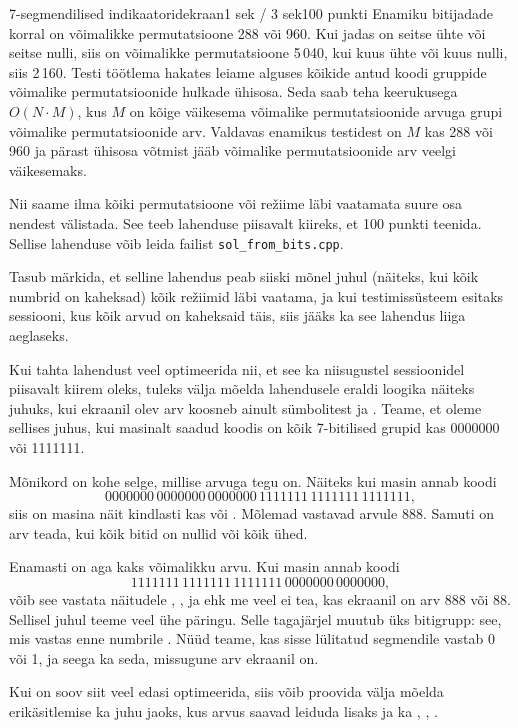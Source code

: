 \begin{yl}{6}{7-segmendilised indikaatorid}{ekraan}{1 sek / 3 sek}{100 punkti}
  Enamiku bitijadade korral on võimalikke permutatsioone 288 või 960.
  Kui jadas on seitse ühte või seitse nulli, siis on võimalikke permutatsioone 5\,040,
  kui kuus ühte või kuus nulli, siis 2\,160.
  Testi töötlema hakates leiame alguses kõikide antud koodi
  gruppide võimalike permutatsioonide hulkade ühisosa. Seda saab teha
  keerukusega $O(N \cdot M)$, kus $M$ on kõige väikesema võimalike permutatsioonide arvuga
  grupi võimalike permutatsioonide arv. Valdavas enamikus testidest on $M$ kas 288 või 960
  ja pärast ühisosa võtmist jääb võimalike permutatsioonide arv veelgi väikesemaks.

  Nii saame ilma kõiki permutatsioone või režiime läbi vaatamata suure osa nendest
  välistada. See teeb lahenduse piisavalt kiireks, et 100 punkti teenida.
  Sellise lahenduse võib leida failist \verb/sol_from_bits.cpp/.

  Tasub märkida, et selline lahendus peab siiski mõnel juhul (näiteks, kui kõik
  numbrid on kaheksad) kõik režiimid läbi vaatama, ja kui testimissüsteem esitaks sessiooni,
  kus kõik arvud on kaheksaid täis, siis jääks ka see lahendus liiga aeglaseks.

  Kui tahta lahendust veel optimeerida nii, et see ka niisugustel sessioonidel piisavalt
  kiirem oleks, tuleks välja mõelda lahendusele eraldi loogika näiteks juhuks, kui
  ekraanil olev arv koosneb ainult sümbolitest  ja . Teame, et oleme
  sellises juhus, kui masinalt saadud koodis on kõik 7-bitilised grupid kas
  0000000 või 1111111.

  Mõnikord on kohe selge, millise arvuga tegu on. Näiteks kui masin annab koodi
  \[ 0000000 \, 0000000 \, 0000000 \, 1111111 \, 1111111 \, 1111111, \]
  siis on masina näit kindlasti kas 
  või . Mõlemad vastavad
  arvule 888. Samuti on arv teada, kui kõik bitid on nullid või kõik ühed.

  Enamasti on aga kaks võimalikku arvu. Kui masin annab koodi
  \[ 1111111 \, 1111111 \, 1111111 \, 0000000 \, 0000000, \]
  võib see vastata näitudele ,
  ,
   ja
   ehk me veel ei tea,
  kas ekraanil on arv 888 või 88. Sellisel juhul teeme veel ühe päringu.
  Selle tagajärjel muutub üks bitigrupp: see, mis vastas enne numbrile .
  Nüüd teame, kas sisse lülitatud segmendile vastab 0 või 1, ja seega ka seda,
  missugune arv ekraanil on.

  Kui on soov siit veel edasi optimeerida, siis võib proovida välja mõelda erikäsitlemise
  ka juhu jaoks, kus arvus saavad
  leiduda lisaks  ja  ka , , .
\end{yl}
